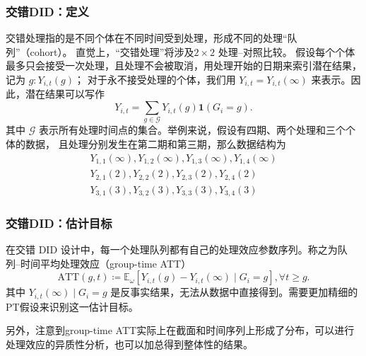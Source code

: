 \documentclass[../didNotes.tex]{subfiles}
\begin{document}
\begin{frame}
  \frametitle{交错DID：定义}

  交错处理指的是不同个体在不同时间受到处理，形成不同的处理``队列''（cohort）。
  直觉上，``交错处理''将涉及\( 2 \times 2 \) 处理--对照比较。
  假设每个个体最多只会接受一次处理，且处理不会被取消，用处理开始的日期来索引潜在结果，记为 \( g: Y_{i,t}(g) \)；
  对于永不接受处理的个体，我们用 \( Y_{i,t}=Y_{i,t}(\infty) \) 来表示。因此，潜在结果可以写作
  \[
    Y_{i,t} = \sum_{g \in \mathcal{G}} Y_{i,t}(g) \mathbf{1}(G_{i}=g)
  .\]
  其中 \( \mathcal{G} \) 表示所有处理时间点的集合。举例来说，假设有四期、两个处理和三个个体的数据，
  且处理分别发生在第二期和第三期，那么数据结构为
  \begin{align*}
    Y_{1,1}(\infty),Y_{1,2}(\infty),Y_{1,3}(\infty),Y_{1,4}(\infty) \\
    Y_{2,1}(2), Y_{2,2}(2), Y_{2,3}(2), Y_{2,4}(2)                  \\
    Y_{3,1}(3), Y_{3,2}(3), Y_{3,3}(3), Y_{3,4}(3)
  \end{align*}

\end{frame}

\begin{frame}
  \frametitle{交错DID：估计目标}

  在交错 DID 设计中，每一个处理队列都有自己的处理效应参数序列。称之为队列--时间平均处理效应（group-time ATT）
  \[
    \text{ATT}(g,t) \coloneqq \mathbb{E}_{\omega}[Y_{i,t}(g)-Y_{i,t}(\infty) \mid G_i = g], \forall t \ge g
  .\]
  其中 \( Y_{i,t}(\infty) \mid G_i=g \) 是反事实结果，无法从数据中直接得到。需要更加精细的PT假设来识别这一估计目标。

  \vspace{1em}
  另外，注意到group-time ATT实际上在截面和时间序列上形成了分布，可以进行处理效应的异质性分析，也可以加总得到整体性的结果。

\end{frame}
\end{document}
